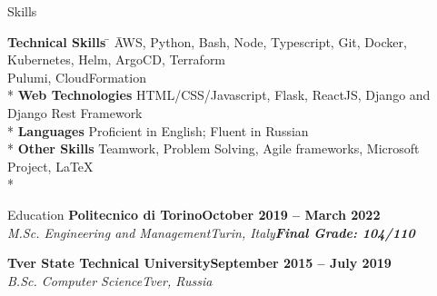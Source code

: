 \documentclass[a4paper]{article}
\newlength{\tabin}
\newlength{\secsep}
\newcommand{\lineunder}{\vspace*{-8pt}\\\hspace*{-6pt}\hrulefill\\\vspace*{-15pt}}
\newcommand{\education}[4]{\vspace{\secsep}\textbf{#1\hfill#2}\\\textit{#3\hfill#4}\vspace{2\secsep}}
\newcommand{\educationwithgrade}[5]{\vspace{\secsep}\textbf{#1\hfill#2}\\\textit{#3\hfill#4}\linebreak\textbf{\textit{#5}}\vspace{2\secsep}}
\newenvironment{tabbedsection}[1]{
  \begin{list}{}{
    \setlength{\itemsep}{0pt}
    \setlength{\labelsep}{0pt}
    \setlength{\labelwidth}{0pt}
    \setlength{\leftmargin}{\tabin}
    \setlength{\rightmargin}{\tabin}
    \setlength{\listparindent}{0pt}
    \setlength{\parsep}{0pt}
    \setlength{\parskip}{0pt}
    \setlength{\partopsep}{0pt}
    \setlength{\topsep}{#1}
  }
  \item[]
}{\end{list}}
\newenvironment{nospacetabbing}{\begin{tabbing}}{\end{tabbing}\vspace{-1.2em}}
\newenvironment{resume_section}[1]{
  \filbreak
  \vspace{2\secsep}
  \textsc{\large#1}
  \lineunder
  \begin{tabbedsection}{\secsep}
}{\end{tabbedsection}}
\begin{document}
\begin{resume_section}{Skills}
  \begin{nospacetabbing}
    \textbf{Technical Skills} \= \hspace{2em} \= AWS, Python, Bash, Node, Typescript, Git, Docker, Kubernetes, Helm, ArgoCD, Terraform\\\> \> Pulumi, CloudFormation\\*
    \textbf{Web Technologies} \> \> HTML/CSS/Javascript, Flask, ReactJS, Django and Django Rest Framework\\*
    \textbf{Languages} \> \> Proficient in English; Fluent in Russian\\*
    \textbf{Other Skills} \> \> Teamwork, Problem Solving, Agile frameworks, Microsoft Project, \LaTeX\\*
  \end{nospacetabbing}
\end{resume_section}

\begin{resume_section}{Education}
  \educationwithgrade{Politecnico di Torino}{October 2019 -- March 2022}{M.Sc. Engineering and Management}{Turin, Italy}{Final Grade: 104/110}

  \education{Tver State Technical University}{September 2015 -- July 2019}{B.Sc. Computer Science}{Tver, Russia}
\end{resume_section}
\end{document}
